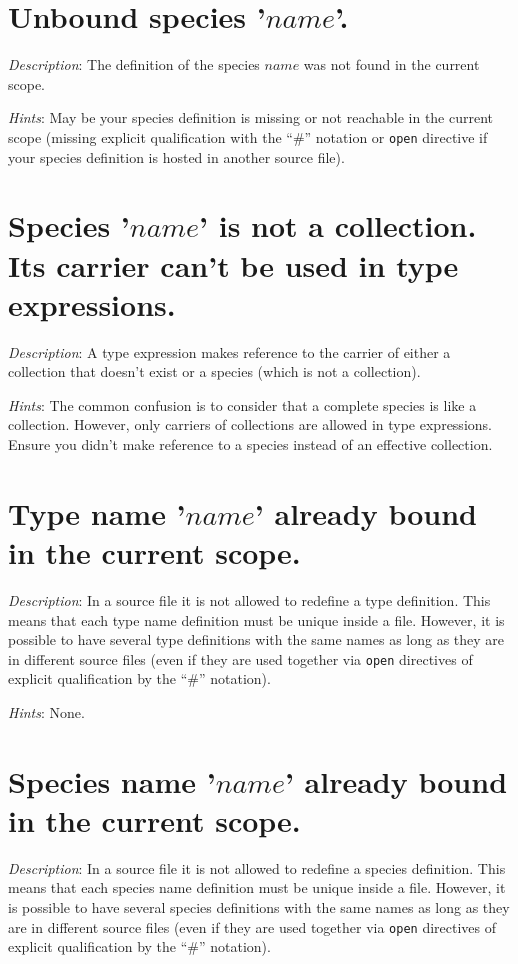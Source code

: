 \section*{Unbound species '$name$'.}
{\em Description}: The definition of the species $name$ was not found
in the current scope.

{\em Hints}: May be your species definition is missing or not
reachable in the current scope (missing explicit qualification with
the ``\#'' notation or {\tt open} directive if your species definition is
hosted in another source file).



\section*{Species '$name$' is not a collection. Its carrier can't be used in type expressions.}
{\em Description}: A type expression makes reference to the carrier of
either a collection that doesn't exist or a species (which is not a
collection).

{\em Hints}: The common confusion is to consider that a complete species
is like a collection. However, only carriers of collections are allowed
in type expressions. Ensure you didn't make reference to a species instead
of an effective collection.



\section*{Type name '$name$' already bound in the current scope.}
{\em Description}: In a source file it is not allowed to redefine a
type definition. This means that each type name definition must be
unique inside a file. However, it is possible to have several type
definitions with the same names as long as they are in different
source files (even if they are used together via {\tt open} directives
of explicit qualification by the ``\#'' notation).

{\em Hints}: None.



\section*{Species name '$name$' already bound in the current scope.}
{\em Description}: In a source file it is not allowed to redefine a
species definition. This means that each species name definition must
be unique inside a file. However, it is possible to have several species
definitions with the same names as long as they are in different
source files (even if they are used together via {\tt open} directives
of explicit qualification by the ``\#'' notation).

